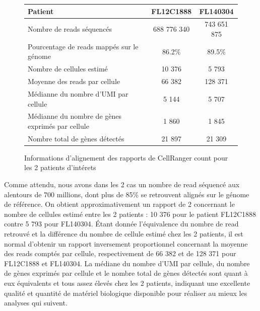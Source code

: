 \documentclass[12pt]{report}
\begin{document}
\begin{figure}[h!]
	\begin{center}
		\begin{tabular}{|l||c|c|}
			\hline
			Patient 											& FL12C1888 	& FL140304 		\\ \hline
			Nombre de reads séquencés							& 688 776 340 	& 743 651 875 	\\ \hline
			Pourcentage de reads mappés sur le génome 			& 86.2\% 		& 89.5\% 		\\ \hline
			Nombre de cellules estimé 							& 10 376 		& 5 793 		\\ \hline
			Moyenne des reads par cellule 						& 66 382 		& 128 371 		\\ \hline
			Médianne du nombre d'UMI par cellule 				& 5 144		 	& 5 707 		\\ \hline
			Médianne du nombre de gènes exprimés par cellule 	& 1 860 		& 1 845 		\\ \hline
			Nombre total de gènes détectés					 	& 21 897 		& 21 309 		\\ \hline
		\end{tabular}
	\end{center}
	\caption{\small{Informations d'alignement des rapports de CellRanger count pour les 2 patients d'intérets}}
	\label{I1}
\end{figure}

Comme attendu, nous avons dans les 2 cas un nombre de read séquencé aux alentours de 700 millions, dont plus de 85\% se retrouvent alignés
sur le génome de référence. On obtient approximativement un rapport de 2 concernant le nombre de cellules estimé entre les 2 patients :
10 376 pour le patient FL12C1888 contre 5 793 pour FL140304. Étant donnée l'équivalence du nombre de read retrouvé et 
la différence du nombre de cellule estimé chez les 2 patients, il est normal d'obtenir un rapport inversement proportionnel
concernant la moyenne des reads comptés par cellule, respectivement de 66 382 et de 128 371 pour FL12C1888 et FL140304.
La médiane du nombre d'UMI par cellule, du nombre de gènes exprimés par cellule et le nombre total de gènes détectés sont quant
à eux équivalents et tous assez élevés chez les 2 patients, indiquant une excellente qualité et quantité de matériel biologique
disponible pour réaliser au mieux les analyses qui suivent.
\end{document}
